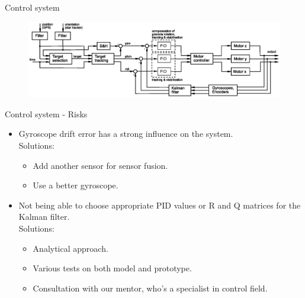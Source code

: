 \documentclass[11pt, aspectratio=169]{beamer}
\begin{document}
\begin{frame}[c]{Control system}
    \begin{figure}
        \includegraphics[width=\linewidth]{figures/images/Control_loop_v2.eps}
    \end{figure}
\end{frame}

\begin{frame}[c]{Control system - Risks}
    \begin{itemize}
        \item Gyroscope drift error has a strong influence on the system.\\
         Solutions: 
        \begin{itemize}
            \item Add another sensor for sensor fusion.
            \item Use a better gyroscope.
        \end{itemize}
        \item Not being able to choose appropriate PID values or R and Q matrices for the Kalman filter.\\
         Solutions: 
        \begin{itemize}
            \item Analytical approach.
            \item Various tests on both model and prototype.
            \item Consultation with our mentor, who's a specialist in control field.
        \end{itemize}
    \end{itemize}
\end{frame}
\end{document}
